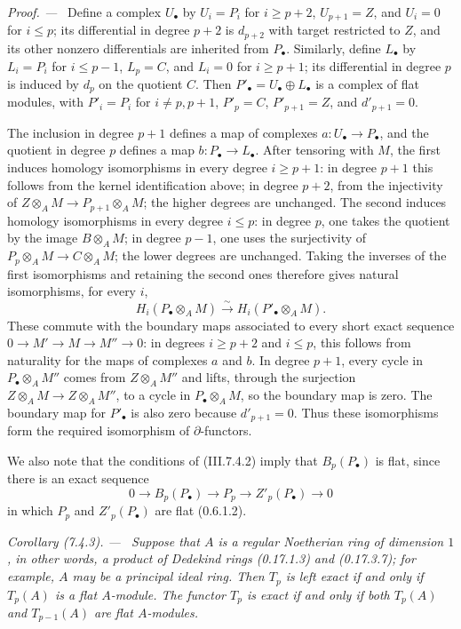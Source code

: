 \documentclass[10pt,oneside]{book}
\newcommand{\sref}[2][]{(#2)}
\newenvironment{corollary}[1][]{\par\medskip\noindent\itshape Corollary (#1). ---\ }{\par}
\newenvironment{proof}{\par\medskip\noindent\textit{Proof. ---\ }}{\par}
\begin{document}
\begin{proof}
Define a complex $U_\bullet$ by $U_i=P_i$ for $i\geq p+2$,
$U_{p+1}=Z$, and $U_i=0$ for $i\leq p$; its differential in degree
$p+2$ is $d_{p+2}$ with target restricted to $Z$, and its other nonzero
differentials are inherited from $P_\bullet$. Similarly, define
$L_\bullet$ by $L_i=P_i$ for $i\leq p-1$, $L_p=C$, and $L_i=0$
for $i\geq p+1$; its differential in degree $p$ is induced by $d_p$
on the quotient $C$.
Then $P'_\bullet=U_\bullet\oplus L_\bullet$ is a complex of flat
modules, with $P'_i=P_i$ for $i\ne p,p+1$, $P'_p=C$,
$P'_{p+1}=Z$, and $d'_{p+1}=0$.

The inclusion in degree $p+1$ defines a map of complexes
$a:U_\bullet\to P_\bullet$, and the quotient in degree $p$ defines
a map $b:P_\bullet\to L_\bullet$. After tensoring with $M$, the
first induces homology isomorphisms in every degree $i\geq p+1$:
in degree $p+1$ this follows from the kernel identification above;
in degree $p+2$, from the injectivity of
$Z\otimes_A M\to P_{p+1}\otimes_A M$; the higher degrees are
unchanged. The second induces homology isomorphisms in every degree
$i\leq p$: in degree $p$, one takes the quotient by the image
$B\otimes_A M$; in degree $p-1$, one uses the surjectivity of
$P_p\otimes_A M\to C\otimes_A M$; the lower degrees are unchanged.
Taking the inverses of the first isomorphisms and retaining the second
ones therefore gives natural isomorphisms, for every $i$,
\[
 H_i(P_\bullet\otimes_A M)\xrightarrow{\sim}
 H_i(P'_\bullet\otimes_A M).
\]
These commute with the boundary maps associated to every short exact
sequence $0\to M'\to M\to M''\to0$: in degrees $i\geq p+2$ and
$i\leq p$, this follows from naturality for the maps of complexes $a$
and $b$. In degree $p+1$, every cycle in $P_\bullet\otimes_A M''$
comes from $Z\otimes_A M''$ and lifts, through the surjection
$Z\otimes_A M\to Z\otimes_A M''$, to a cycle in
$P_\bullet\otimes_A M$, so the boundary map is zero. The boundary
map for $P'_\bullet$ is also zero because $d'_{p+1}=0$.
Thus these isomorphisms form the required isomorphism of
$\partial$-functors.

We also note that the conditions of \sref{III.7.4.2} imply
that $B_p(P_\bullet)$ is flat, since there is an exact sequence
\[
  0
  \longrightarrow B_p(P_\bullet)
  \longrightarrow P_p
  \longrightarrow Z'_p(P_\bullet)
  \longrightarrow 0
\]
in which $P_p$ and $Z'_p(P_\bullet)$ are flat
\sref[0]{0.6.1.2}.
\end{proof}

\begin{corollary}[7.4.3]
\label{III.7.4.3}
Suppose that $A$ is a regular Noetherian ring of dimension
$1$, in other words, a product of Dedekind rings
\sref[0]{0.17.1.3} and \sref[0]{0.17.3.7}; for example, $A$
may be a principal ideal ring.  Then $T_p$ is left exact if
and only if $T_p(A)$ is a flat $A$-module.  The functor $T_p$
is exact if and only if both $T_p(A)$ and $T_{p-1}(A)$ are
flat $A$-modules.
\end{corollary}
\end{document}
